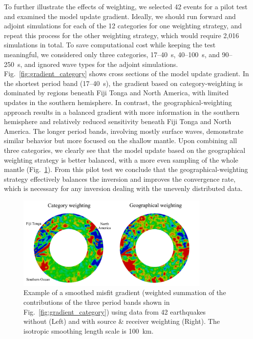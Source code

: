 To further illustrate the effects of weighting, we selected 42 events for a 
pilot test and examined the model update gradient. Ideally, we should run forward and adjoint simulations for 
each of the 12 categories for one weighting strategy, and repeat this process for the other weighting strategy, which would require 2,016
simulations in total.
To save computational cost while keeping the test meaningful,
we considered only three categories, 17--40~s, 40--100~s, 
and 90--250~s, and ignored wave types for the adjoint simulations. 
Fig.~\ref{fig:gradient_category} shows cross sections of the model update gradient.
In the shortest period band (17--40~s),
the gradient based on category-weighting is
dominated by regions beneath Fiji Tonga and North America,
with limited updates in the southern hemisphere.
In contrast, the geographical-weighting approach results in a balanced gradient with
more information in the southern hemisphere and relatively reduced sensitivity beneath Fiji Tonga and North America.  
The longer period bands, involving mostly surface waves,
demonstrate similar behavior but more focused on the shallow mantle.  
Upon combining all three categories, we clearly see that the model update based on the geographical 
weighting strategy is better balanced, with a more even sampling of the whole mantle (Fig.~\ref{fig:gradient_sum}).  
From this pilot test we conclude that the geographical-weighting strategy effectively 
balances the inversion and improves the convergence rate, which is necessary for any inversion dealing 
with the unevenly distributed data.

\begin{figure}
\centering
\includegraphics[width=0.85\textwidth]{ch-weighting/figures/Figure-11-small.pdf}
  \caption[Example of the summation of smoothed misfit gradients from three period bands]
  {\small{Example of a smoothed misfit gradient (weighted summation of the contributions of the three period bands shown in Fig.~\ref{fig:gradient_category}) 
using data from 42 earthquakes without (Left) and with source \& receiver weighting (Right). The isotropic smoothing length scale is 100~km.
}}
\label{fig:gradient_sum}
\end{figure}

